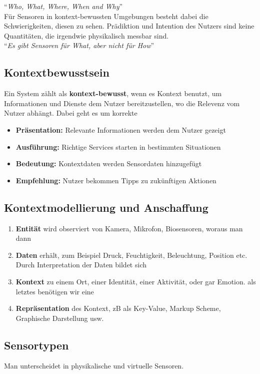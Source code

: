 \documentclass[a4paper]{article}
\begin{document}
``\textit{Who, What, Where, When and Why}'' \\

Für Sensoren in kontext-bewussten Umgebungen besteht dabei die Schwierigkeiten, diesen zu sehen. Prädiktion und Intention des Nutzers sind keine Quantitäten, die irgendwie physikalisch messbar sind. \\

``\textit{Es gibt Sensoren für What, aber nicht für How}''

\subsection{Kontextbewusstsein}
Ein System zählt als \textbf{kontext-bewusst}, wenn es Kontext benutzt, um Informationen und Dienste dem Nutzer bereitzustellen, wo die Relevenz vom Nutzer abhängt. Dabei geht es um korrekte
\begin{itemize}
	\item \textbf{Präsentation:} Relevante Informationen werden dem Nutzer gezeigt
	\item \textbf{Ausführung:} Richtige Services starten in bestimmten Situationen
	\item \textbf{Bedeutung:} Kontextdaten werden Sensordaten hinzugefügt
	\item \textbf{Empfehlung:} Nutzer bekommen Tipps zu zukünftigen Aktionen
\end{itemize}

\subsection{Kontextmodellierung und Anschaffung}
\begin{enumerate}
	\item \textbf{Entität} wird observiert von Kamera, Mikrofon, Biosensoren, woraus man dann
	\item \textbf{Daten} erhält, zum Beispiel Druck, Feuchtigkeit, Beleuchtung, Position etc. Durch Interpretation der Daten bildet sich
	\item \textbf{Kontext} zu einem Ort, einer Identität, einer Aktivität, oder gar Emotion. als letztes benötigen wir eine
	\item \textbf{Repräsentation} des Kontext, zB als Key-Value, Markup Scheme, Graphische Darstellung usw.
\end{enumerate}
\subsection{Sensortypen}
Man unterscheidet in {physikalische} und {virtuelle} Sensoren.\\
\end{document}
